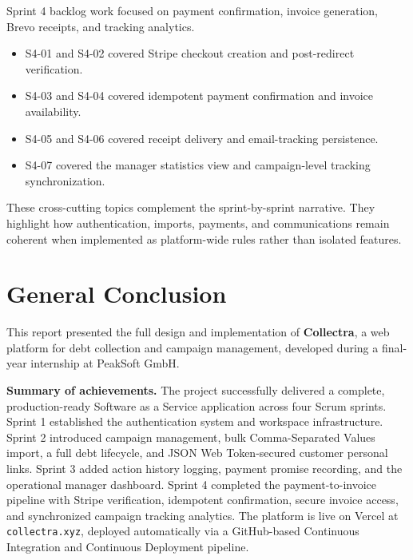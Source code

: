 ﻿\documentclass[12pt,a4paper]{report}
\newcommand{\reporttablesetup}{%
  \small%
  \microtypesetup{activate=false}%
  \setlength{\tabcolsep}{5pt}%
  \renewcommand{\arraystretch}{1.38}%
  \arrayrulecolor{framegray}%
}
\begin{document}
\begin{table}[H]
  \centering
  \reporttablesetup
  \noindent Sprint 4 backlog work focused on payment confirmation, invoice generation, Brevo receipts, and tracking analytics.

  \begin{itemize}
    \item S4-01 and S4-02 covered Stripe checkout creation and post-redirect verification.
    \item S4-03 and S4-04 covered idempotent payment confirmation and invoice availability.
    \item S4-05 and S4-06 covered receipt delivery and email-tracking persistence.
    \item S4-07 covered the manager statistics view and campaign-level tracking synchronization.
  \end{itemize}
\end{table}

These cross-cutting topics complement the sprint-by-sprint narrative.
They highlight how authentication, imports, payments, and communications remain coherent when
implemented as platform-wide rules rather than isolated features.

\chapter*{General Conclusion}
{}

This report presented the full design and implementation of \textbf{Collectra}, a
web platform for debt collection and campaign management, developed during a
final-year internship at PeakSoft GmbH.

\textbf{Summary of achievements.}
The project successfully delivered a complete, production-ready Software as a Service application
across four Scrum sprints.
Sprint 1 established the authentication system and workspace infrastructure.
Sprint 2 introduced campaign management, bulk Comma-Separated Values import, a full debt lifecycle,
and JSON Web Token-secured customer personal links.
Sprint 3 added action history logging, payment promise recording, and the operational
manager dashboard.
Sprint 4 completed the payment-to-invoice pipeline with Stripe verification,
idempotent confirmation, secure invoice access, and synchronized campaign
tracking analytics.
The platform is live on Vercel at \texttt{collectra.xyz}, deployed automatically
via a GitHub-based Continuous Integration and Continuous Deployment pipeline.
\end{document}
